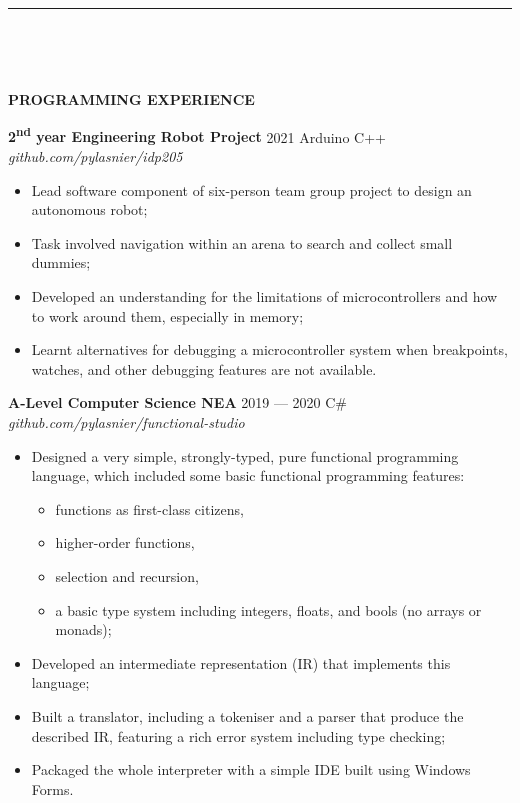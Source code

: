 \documentclass[
  11pt,
  a4paper,
]{article}
\providecommand{\tightlist}{%
  \setlength{\itemsep}{0pt}\setlength{\parskip}{0pt}}
\newcommand{\ruledheader}[2]{%
\begingroup
\setlength{\fboxsep}{0pt}%
\colorbox{#1}{%
\parbox[b][1.2ex][t]{35mm}{\begin{tiny}\ \end{tiny}}}%
\parbox[b][1.2ex][t]{5mm}{\begin{tiny}\ \end{tiny}}%
\uppercase{\textbf{#2}}
\endgroup}
\begin{document}
\begin{Large}

\vspace{-1.5ex}\rule{\textwidth}{0.8pt}\vspace{2ex}

\ruledheader{cyan!50!teal}{Programming experience}\end{Large}

\textbf{2\textsuperscript{nd} year Engineering Robot Project} \textbar{}
2021 \textbar{} Arduino C++ \textbar{}
\emph{github.com/pylasnier/idp205}

\begin{itemize}
\tightlist
\item
  Lead software component of six-person team group project to design an
  autonomous robot;
\item
  Task involved navigation within an arena to search and collect small
  dummies;
\item
  Developed an understanding for the limitations of microcontrollers and
  how to work around them, especially in memory;
\item
  Learnt alternatives for debugging a microcontroller system when
  breakpoints, watches, and other debugging features are not available.
\end{itemize}

\textbf{A-Level Computer Science NEA} \textbar{} 2019 --- 2020
\textbar{} C\# \textbar{} \emph{github.com/pylasnier/functional-studio}

\begin{itemize}
\tightlist
\item
  Designed a very simple, strongly-typed, pure functional programming
  language, which included some basic functional programming features:

  \begin{itemize}
  \tightlist
  \item
    functions as first-class citizens,
  \item
    higher-order functions,
  \item
    selection and recursion,
  \item
    a basic type system including integers, floats, and bools (no arrays
    or monads);
  \end{itemize}
\item
  Developed an intermediate representation (IR) that implements this
  language;
\item
  Built a translator, including a tokeniser and a parser that produce
  the described IR, featuring a rich error system including type
  checking;
\item
  Packaged the whole interpreter with a simple IDE built using Windows
  Forms.
\end{itemize}
\end{document}
